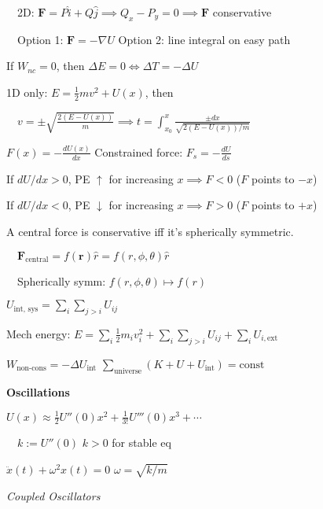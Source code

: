 \documentclass[twocolumn]{article}
\begin{document}
$\quad$2D: $\mathbf{F} = P \hat{i} + Q \hat{j} \implies Q_x - P_y = 0 \implies \mathbf{F}$ conservative

$\quad$Option 1: $\mathbf{F} = - \nabla U$ \hfill Option 2: line integral on easy path

If $W_{nc} = 0$, then $\Delta E = 0 \iff \Delta T = -\Delta U$

1D only: $E = \frac{1}{2} mv^2 + U(x)$, then

$\quad v = \pm \sqrt{\frac{2(E-U(x))}{m}} \implies t = \int_{x_0}^x \frac{\pm dx}{\sqrt{2(E-U(x))/m}}$


\cleardoublepage


$F(x) = -\frac{dU(x)}{dx}$ \hfill Constrained force: $F_s = -\frac{dU}{ds}$

If $dU/dx > 0$, PE $\uparrow$ for increasing $x \implies F < 0$ ($F$ points to $-x$)

If $dU/dx < 0$, PE $\downarrow$ for increasing $x \implies F > 0$ ($F$ points to $+x$)

A central force is conservative iff it's spherically symmetric.

$\quad \mathbf{F}_{\text{central}} = f(\mathbf{r}) \hat{r} = f(r, \phi, \theta) \hat{r}$

$\quad$Spherically symm: $f(r, \phi, \theta) \mapsto f(r)$

$U_{\text{int, sys}} = \sum_i \sum_{j>i} U_{ij}$

Mech energy: $E = \sum_i \frac{1}{2} m_i v_i^2 + \sum_i \sum_{j > i} U_{ij} + \sum_i U_{i, \text{ext}}$

$W_{\text{non-cons}} = -\Delta U_{\text{int}}$ \hfill $\sum_{\text{universe}} (K + U + U_{\text{int}}) = \text{const}$

\dotfill

\textbf{Oscillations}

$U(x) \approx \frac{1}{2} U''(0) x^2 + \frac{1}{3!} U'''(0) x^3 + \cdots$

$\quad k := U''(0)$ \hfill $k > 0$ for stable eq

$\ddot{x}(t) + \omega^2 x(t) = 0$ \hfill $\omega = \sqrt{k/m}$

\vspace{-.5em}
\dotfill

\textit{Coupled Oscillators}
\end{document}
